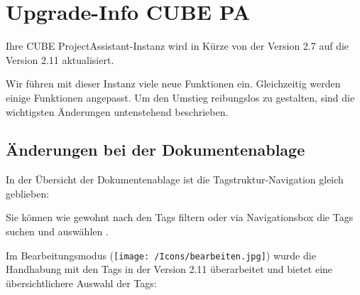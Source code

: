 \section{Upgrade-Info CUBE PA} %

Ihre CUBE ProjectAssistant-Instanz wird in Kürze von der Version 2.7 auf die Version 2.11 aktualisiert.

\vspace{\baselineskip}

Wir führen mit dieser Instanz viele neue Funktionen ein. Gleichzeitig werden einige Funktionen angepasst. Um den Umstieg reibungslos zu gestalten, sind die wichtigsten Änderungen untenstehend beschrieben.

\subsection{Änderungen bei der Dokumentenablage} %

In der Übersicht der Dokumentenablage ist die Tagstruktur-Navigation gleich geblieben:

\begin{figure}[H]
\end{figure}

Sie können wie gewohnt nach den Tags filtern oder via Navigationsbox die Tags suchen und auswählen .

Im Bearbeitungsmodus (\texttt{[image: /Icons/bearbeiten.jpg]}) wurde die Handhabung mit den Tags in der Version 2.11 überarbeitet und bietet eine übersichtlichere Auswahl der Tags:

\begin{figure}[H]
\end{figure}

